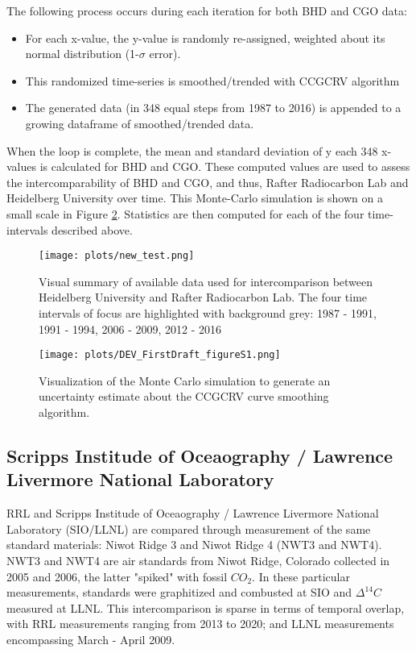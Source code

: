 \documentclass{article}
\begin{document}
The following process occurs during each iteration for both BHD and CGO data: 
\begin{itemize}
	\item For each x-value, the y-value is  randomly re-assigned, weighted about its normal distribution (1-${\sigma}$ error). 
	\item This randomized time-series is smoothed/trended with CCGCRV algorithm 
	\item The generated data (in 348 equal steps from 1987 to 2016) is appended to a growing dataframe of smoothed/trended data.
\end{itemize}
When the loop is complete, the mean and standard deviation of y each 348 x-values is calculated for BHD and CGO. These computed values are used to assess the intercomparability of BHD and CGO, and thus, Rafter Radiocarbon Lab and Heidelberg University over time. This Monte-Carlo simulation is shown on a small scale in Figure \ref{fig:montecarloexplained}. Statistics are then computed for each of the four time-intervals described above. 



\begin{figure}[h!]
  \centering
  \texttt{[image: plots/new\_test.png]}
  \caption{Visual summary of available data used for intercomparison between Heidelberg University and Rafter Radiocarbon Lab. The four time intervals of focus are highlighted with background grey: 1987 - 1991, 1991 - 1994, 2006 - 2009, 2012 - 2016 }
  \label{fig:4timeintervals}
\end{figure}

\begin{figure}[htp]
    \centering
    \texttt{[image: plots/DEV\_FirstDraft\_figureS1.png]}
    \caption{Visualization of the Monte Carlo simulation to generate an uncertainty estimate about the CCGCRV curve smoothing algorithm.}
    \label{fig:montecarloexplained}
\end{figure}

\subsection{Scripps Institude of Oceaography / Lawrence Livermore National Laboratory}

RRL and Scripps Institude of Oceaography / Lawrence Livermore National Laboratory (SIO/LLNL) are compared through measurement of the same standard materials: Niwot Ridge 3 and Niwot Ridge 4 (NWT3 and NWT4). NWT3 and NWT4 are air standards from Niwot Ridge, Colorado collected in 2005 and 2006, the latter "spiked" with fossil ${CO_{2}}$. In these particular measurements, standards were graphitized and combusted at SIO and ${\Delta^{14}C}$ measured at LLNL. This intercomparison is sparse in terms of temporal overlap, with RRL measurements ranging from 2013 to 2020; and LLNL measurements encompassing March - April 2009. 
\end{document}
